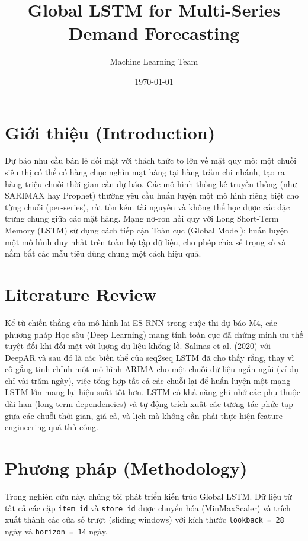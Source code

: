 \documentclass{article}
\title{Global LSTM for Multi-Series Demand Forecasting}
\author{Machine Learning Team}
\date{\today}
\begin{document}
\maketitle

\section{Giới thiệu (Introduction)}
Dự báo nhu cầu bán lẻ đối mặt với thách thức to lớn về mặt quy mô: một chuỗi siêu thị có thể có hàng chục nghìn mặt hàng tại hàng trăm chi nhánh, tạo ra hàng triệu chuỗi thời gian cần dự báo. Các mô hình thống kê truyền thống (như SARIMAX hay Prophet) thường yêu cầu huấn luyện một mô hình riêng biệt cho từng chuỗi (per-series), rất tốn kém tài nguyên và không thể học được các đặc trưng chung giữa các mặt hàng. Mạng nơ-ron hồi quy với Long Short-Term Memory (LSTM) sử dụng cách tiếp cận Toàn cục (Global Model): huấn luyện một mô hình duy nhất trên toàn bộ tập dữ liệu, cho phép chia sẻ trọng số và nắm bắt các mẫu tiêu dùng chung một cách hiệu quả.

\section{Literature Review}
Kể từ chiến thắng của mô hình lai ES-RNN trong cuộc thi dự báo M4, các phương pháp Học sâu (Deep Learning) mang tính toàn cục đã chứng minh ưu thế tuyệt đối khi đối mặt với lượng dữ liệu khổng lồ. Salinas et al. (2020) với DeepAR và sau đó là các biến thể của seq2seq LSTM đã cho thấy rằng, thay vì cố gắng tinh chỉnh một mô hình ARIMA cho một chuỗi dữ liệu ngắn ngủi (ví dụ chỉ vài trăm ngày), việc tổng hợp tất cả các chuỗi lại để huấn luyện một mạng LSTM lớn mang lại hiệu suất tốt hơn. LSTM có khả năng ghi nhớ các phụ thuộc dài hạn (long-term dependencies) và tự động trích xuất các tương tác phức tạp giữa các chuỗi thời gian, giá cả, và lịch mà không cần phải thực hiện feature engineering quá thủ công.

\section{Phương pháp (Methodology)}
Trong nghiên cứu này, chúng tôi phát triển kiến trúc Global LSTM. Dữ liệu từ tất cả các cặp \texttt{item\_id} và \texttt{store\_id} được chuyển hóa (MinMaxScaler) và trích xuất thành các cửa sổ trượt (sliding windows) với kích thước \texttt{lookback = 28} ngày và \texttt{horizon = 14} ngày. 
\end{document}
